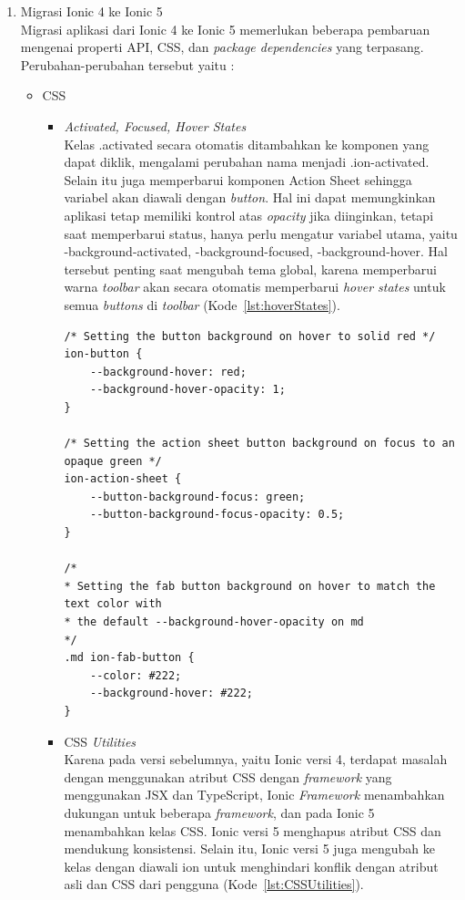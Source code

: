 \begin{enumerate}
\begin{enumerate}
	\end{enumerate}
	\item Migrasi Ionic 4 ke Ionic 5 \\
	Migrasi aplikasi dari Ionic 4 ke Ionic 5 memerlukan beberapa pembaruan mengenai properti API, CSS, dan {\it package dependencies} yang terpasang. Perubahan-perubahan tersebut yaitu :

	\begin{itemize}
		\item CSS
		\begin{itemize}
			\item {\it Activated, Focused, Hover States} \\
			Kelas .activated secara otomatis ditambahkan ke komponen yang dapat diklik, mengalami perubahan nama menjadi .ion-activated. Selain itu juga memperbarui komponen Action Sheet sehingga variabel akan diawali dengan {\it button}. Hal ini dapat memungkinkan aplikasi tetap memiliki kontrol atas {\it opacity} jika diinginkan, tetapi saat memperbarui status, hanya perlu mengatur variabel utama, yaitu -background-activated, -background-focused, -background-hover. Hal tersebut penting saat mengubah tema global, karena memperbarui warna {\it toolbar} akan secara otomatis memperbarui {\it hover states} untuk semua {\it buttons} di {\it toolbar} (Kode~\ref{lst:hoverStates}). 		
			
\begin{lstlisting}[label={lst:hoverStates}, caption=Contoh Kode {\it Hover States} pada Ionic 5]
/* Setting the button background on hover to solid red */
ion-button {
	--background-hover: red;
	--background-hover-opacity: 1;
}

/* Setting the action sheet button background on focus to an opaque green */
ion-action-sheet {
	--button-background-focus: green;
	--button-background-focus-opacity: 0.5;
}

/*
* Setting the fab button background on hover to match the text color with
* the default --background-hover-opacity on md
*/
.md ion-fab-button {
	--color: #222;
	--background-hover: #222;
}
\end{lstlisting} 

			\item CSS {\it Utilities} \\
			Karena pada versi sebelumnya, yaitu Ionic versi 4, terdapat masalah dengan menggunakan atribut CSS dengan {\it framework} yang menggunakan JSX dan TypeScript, Ionic {\it Framework} menambahkan dukungan untuk beberapa {\it framework}, dan pada Ionic 5 menambahkan kelas CSS. Ionic versi 5 menghapus atribut CSS dan mendukung konsistensi. Selain itu, Ionic versi 5 juga mengubah ke kelas dengan diawali ion untuk menghindari konflik dengan atribut asli dan CSS dari pengguna (Kode~\ref{lst:CSSUtilities}).		
			

\end{itemize}
\end{itemize}
\end{enumerate}
